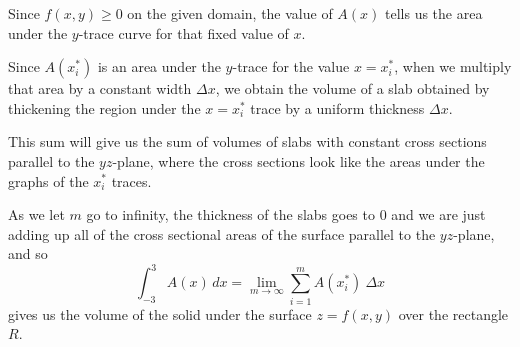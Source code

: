 \begin{activitySolution}
	\ba
	\item  Since $f(x,y) \geq 0$ on the given domain, the value of $A(x)$ tells us the area under the $y$-trace curve for that fixed value of $x$.

  	\item Since $A(x_i^*)$ is an area under the $y$-trace for the value $x = x_i^*$, when we multiply that area by a constant width $\Delta x$, we obtain the volume of a slab obtained by thickening the region under the $x=x_i^*$ trace by a uniform thickness $\Delta x$.


	\item This sum will give us the sum of volumes of slabs with constant cross sections parallel to the $yz$-plane, where the cross sections look like the areas under the graphs of the $x_i^*$ traces. 


	\item As we let $m$ go to infinity, the thickness of the slabs goes to 0 and we are just adding up all of the cross sectional areas of the surface parallel to the $yz$-plane, and so 
\[\int_{-3}^3 A(x) \, dx = \lim_{m \to \infty} \sum_{i=1}^m A(x_i^*) \ \Delta x\]
gives us the volume of the solid under the surface $z = f(x,y)$ over the rectangle $R$.

	\ea

\end{activitySolution}

\afterpa 